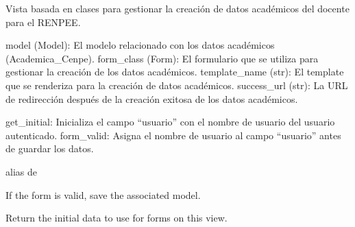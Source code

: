 \documentclass[letterpaper,10pt,spanish]{sphinxmanual}
\begin{document}
\begin{fulllineitems}

\pysigstartsignatures
{}
\pysigstopsignatures
\sphinxAtStartPar
Vista basada en clases para gestionar la creación de datos académicos del docente para el RENPEE.
\begin{description}
\sphinxAtStartPar
model (Model): El modelo relacionado con los datos académicos (Academica\_Cenpe).
form\_class (Form): El formulario que se utiliza para gestionar la creación de los datos académicos.
template\_name (str): El template que se renderiza para la creación de datos académicos.
success\_url (str): La URL de redirección después de la creación exitosa de los datos académicos.

\sphinxAtStartPar
get\_initial: Inicializa el campo “usuario” con el nombre de usuario del usuario autenticado.
form\_valid: Asigna el nombre de usuario al campo “usuario” antes de guardar los datos.

\end{description}


\begin{fulllineitems}

\pysigstartsignatures
{}
\pysigstopsignatures
\sphinxAtStartPar
alias de 

\end{fulllineitems}



\begin{fulllineitems}

\pysigstartsignatures
{}
\pysigstopsignatures
\sphinxAtStartPar
If the form is valid, save the associated model.

\end{fulllineitems}



\begin{fulllineitems}

\pysigstartsignatures
{}
\pysigstopsignatures
\sphinxAtStartPar
Return the initial data to use for forms on this view.


\end{fulllineitems}
\end{fulllineitems}
\end{document}
